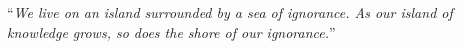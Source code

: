 \documentclass[
12pt, %
english, %
singlespacing, %
liststotoc, %
toctotoc, %
parskip, %
headsepline, %
consistentlayout, %
]{MastersDoctoralThesis} %
\begin{document}
\cleardoublepage


\vspace*{0.2\textheight}



\noindent\enquote{\itshape We live on an island surrounded by a sea of ignorance. As our island of knowledge grows, so does the shore of our ignorance.}\bigbreak



\begin{abstract}
\addchaptertocentry{\abstractname} %

\end{abstract}


\begin{acknowledgements}
\addchaptertocentry{\acknowledgementname} %

\end{acknowledgements}

\onehalfspacing
\tableofcontents %


\listoffigures %

\listoftables %

\end{document}
